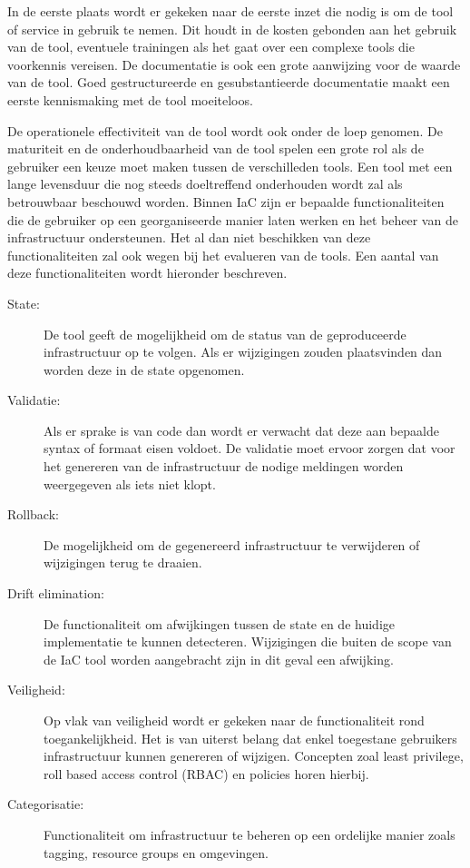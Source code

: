 In de eerste plaats wordt er gekeken naar de eerste inzet die nodig is om de tool of service in gebruik te nemen.
Dit houdt in de kosten gebonden aan het gebruik van de tool, eventuele trainingen als het gaat over een complexe tools die voorkennis vereisen.
De documentatie is ook een grote aanwijzing voor de waarde van de tool.
Goed gestructureerde en gesubstantieerde documentatie maakt een eerste kennismaking met de tool moeiteloos.

De operationele effectiviteit van de tool wordt ook onder de loep genomen.
De maturiteit en de onderhoudbaarheid van de tool spelen een grote rol als de gebruiker een keuze moet maken tussen de verschilleden tools.
Een tool met een lange levensduur die nog steeds doeltreffend onderhouden wordt zal als betrouwbaar beschouwd worden.
Binnen IaC zijn er bepaalde functionaliteiten die de gebruiker op een georganiseerde manier laten werken en het beheer van de infrastructuur ondersteunen.
Het al dan niet beschikken van deze functionaliteiten zal ook wegen bij het evalueren van de tools.
Een aantal van deze functionaliteiten wordt hieronder beschreven.

\begin{description}
    \item[State:] De tool geeft de mogelijkheid om de status van de geproduceerde infrastructuur op te volgen. Als er wijzigingen zouden plaatsvinden dan worden deze in de state opgenomen.
    \item[Validatie:] Als er sprake is van code dan wordt er verwacht dat deze aan bepaalde syntax of formaat eisen voldoet. De validatie moet ervoor zorgen dat voor het genereren van de infrastructuur de nodige meldingen worden weergegeven als iets niet klopt.
    \item[Rollback:] De mogelijkheid om de gegenereerd infrastructuur te verwijderen of wijzigingen terug te draaien.
    \item[Drift elimination:] De functionaliteit om afwijkingen tussen de state en de huidige implementatie te kunnen detecteren. Wijzigingen die buiten de scope van de IaC tool worden aangebracht zijn in dit geval een afwijking.
    \item[Veiligheid:] Op vlak van veiligheid wordt er gekeken naar de functionaliteit rond toegankelijkheid. Het is van uiterst belang dat enkel toegestane gebruikers infrastructuur kunnen genereren of wijzigen. Concepten zoal least privilege, roll based access control (RBAC) en policies horen hierbij.
    \item[Categorisatie:] Functionaliteit om infrastructuur te beheren op een ordelijke manier zoals tagging, resource groups en omgevingen.
\end{description}


